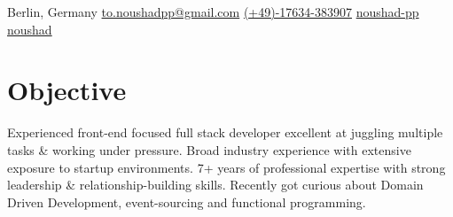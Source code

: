 \documentclass{resume_base}
\begin{document}
	\contact
		{\color{\themeColor} \iconSpace \small {} \color{black}Berlin, Germany}
		{\color{\themeColor} \iconSpace \small {} \href{mailto://to.noushadpp@gmail.com}{to.noushadpp@gmail.com}}
		{\color{\themeColor} \iconSpace \small {}  \href{tel://+4917634383907}{(+49)-17634-383907}}
		{\color{\themeColor} \iconSpace \small {} \href{https://github.com/noushad-pp/}{noushad-pp}}
		{\color{\themeColor} \iconSpace \small {} \href{https://stackoverflow.com/users/5466933/noushad?tab=profile}{noushad}}
	
	\section{Objective}\label{sec:objective}
		\hspace{1pt}\parbox{0.99\textwidth}{
			Experienced front-end focused full stack developer excellent at juggling multiple tasks \& working under pressure. Broad industry experience with extensive exposure to startup environments. 7+ years of professional expertise with strong leadership \& relationship-building skills. Recently got curious about Domain Driven Development, event-sourcing and functional programming.
		}

\end{document}
